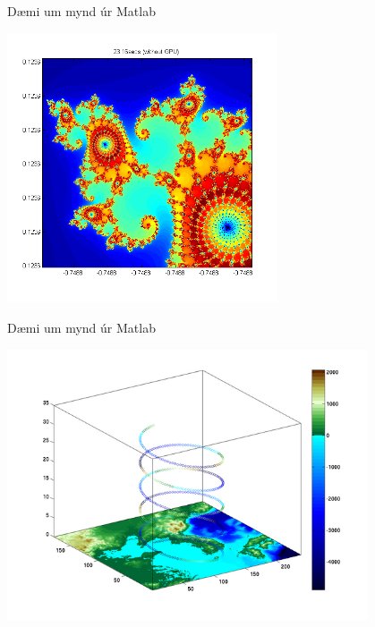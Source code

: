 \documentclass{beamer}
\begin{document}
\begin{frame}{Dæmi um mynd úr Matlab}
\begin{center}
\vspace{\baselineskip}
\includegraphics[width=0.6\textwidth]{../Pics/plot-example3}
\end{center}
\end{frame}

\begin{frame}{Dæmi um mynd úr Matlab}
\begin{center}
\includegraphics[width=0.8\textwidth]{../Pics/plot-example4}
\end{center}
\end{frame}
\end{document}
